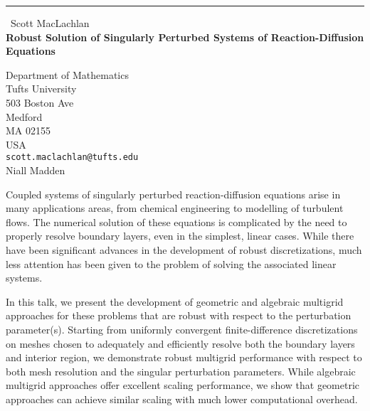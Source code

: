 \documentclass{report}
\begin{document}
\begin{center}
\rule{6in}{1pt} \
{\large Scott MacLachlan \\
{\bf Robust Solution of Singularly Perturbed Systems of Reaction-Diffusion Equations}}

Department of Mathematics \\ Tufts University \\ 503 Boston Ave \\ Medford \\ MA 02155 \\ USA
\\
{\tt scott.maclachlan@tufts.edu}\\
Niall Madden\end{center}

Coupled systems of singularly perturbed reaction-diffusion equations
arise in many applications areas, from chemical engineering to
modelling of turbulent flows. The numerical solution of these
equations is complicated by the need to properly resolve boundary
layers, even in the simplest, linear cases. While there have been
significant advances in the development of robust discretizations,
much less attention has been given to the problem of solving the
associated linear systems.

In this talk, we present the development of geometric and algebraic
multigrid approaches for these problems that are robust with respect
to the perturbation parameter(s). Starting from uniformly convergent
finite-difference discretizations on meshes chosen to adequately and
efficiently resolve both the boundary layers and interior region, we
demonstrate robust multigrid performance with respect to both mesh
resolution and the singular perturbation parameters. While algebraic
multigrid approaches offer excellent scaling performance, we show that
geometric approaches can achieve similar scaling with much lower
computational overhead.
\end{document}
